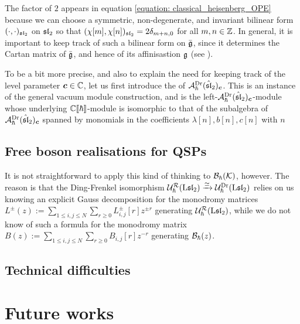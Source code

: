             \begin{remark}
                The factor of $2$ appears in equation \eqref{equation: classical_heisenberg_OPE} because we can choose a symmetric, non-degenerate, and invariant bilinear form $(\cdot, \cdot)_{\sl_2}$ on $\sl_2$ so that $( \chi[m], \chi[n] )_{\sl_2} = 2 \delta_{m + n, 0}$ for all $m, n \in \Z$. In general, it is important to keep track of such a bilinear form on $\bar{\g}$, since it determines the Cartan matrix of $\bar{\g}$, and hence of its affinisastion $\g$ (see \cite[Chapter 7]{kac_infinite_dimensional_lie_algebras}).
            \end{remark}

            To be a bit more precise, and also to explain the need for keeping track of the level parameter $\level \in \bbC$, let us first introduce the  of $\calA_{\hbar}^{\current}(\hat{\sl}_2)_{\level}$. This is an instance of the general vacuum module construction, and is the left-$\calA_{\hbar}^{\current}(\hat{\sl}_2)_{\level}$-module whose underlying $\bbC[\![\hbar]\!]$-module is isomorphic to that of the subalgebra of $\calA_{\hbar}^{\current}(\hat{\sl}_2)_{\level}$ spanned by monomials in the coefficients $\lambda[n], b[n], c[n]$ with $n $
    
        \subsection{Free boson realisations for QSPs}
            It is not straightforward to apply this kind of thinking to $\calB_{\hbar}(\calK)$, however. The reason is that the Ding-Frenkel isomorphism $\calU_{\hbar}^{\calR}(\Loop \sl_2) \xrightarrow[]{\cong} \calU_{\hbar}^{\current}(\Loop \sl_2)$ relies on us knowing an explicit Gauss decomposition for the monodromy matrices $L^{\pm}(z) := \sum_{1 \leq i, j \leq N} \sum_{r \geq 0} L^{\pm}_{i, j}[r] z^{\pm r}$ generating $\calU_{\hbar}^{\calR}(\Loop \sl_2)$, while we do not know of such a formula for the monodromy matrix $B(z) := \sum_{1 \leq i, j \leq N} \sum_{r \geq 0} B_{i, j}[r] z^{-r}$ generating $\calB_{\hbar}(z)$. 

        \subsection{Technical difficulties}

    \section{Future works}
    
    \printbibliography

